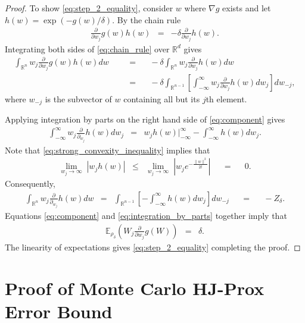 \documentclass{article}
\newcommand{\Real}{\mathbb{R}}
\newcommand{\E}{\mathbb{E}}
\newcommand{\amp}{\mathop{\:\:\,}\nolimits}
\theoremstyle{plain}
\theoremstyle{definition}
\theoremstyle{remark}
\begin{document}
\begin{proof}
To show \eqref{eq:step_2_equality}, consider $w$ where $\nabla g$ exists and let $h(w) = \exp(-g(w)/\delta)$. By the chain rule
\begin{eqnarray}
\label{eq:chain_rule}
\frac{\partial}{\partial w_j} g(w)h(w) & = & - \delta \frac{\partial}{\partial w_j}h(w).
\end{eqnarray}
Integrating both sides of \eqref{eq:chain_rule} over $\Real^d$ gives
\begin{equation}
\label{eq:component}
\begin{split}
    \int_{\Real^n} w_j \frac{\partial}{\partial w_j}g(w) h(w) dw  & \amp = \amp  -\delta \int_{\Real^n}  w_j \frac{\partial}{\partial w_j} h(w) dw \\ 
    & \amp = \amp -\delta\int_{\Real^{n-1}}\left[\int_{-\infty}^\infty w_j \frac{\partial}{\partial w_j}h(w)dw_j\right]dw_{-j},
\end{split}
\end{equation}
where
$w_{-j}$ is the subvector of $w$ containing all but its $j$th element.

Applying integration by parts on the right hand side of \eqref{eq:component} gives
\begin{eqnarray}
\int_{-\infty}^\infty w_j \frac{\partial}{\partial_{w_j}}h(w) d w_j & = & w_j h(w)\Big |_{-\infty}^\infty - \int_{-\infty}^\infty h(w)dw_j.
\end{eqnarray}
Note that \eqref{eq:strong_convexity_inequality} implies that
\begin{eqnarray}
\underset{w_j \rightarrow \infty}{\lim}\;
\left\lvert w_j h(w) \right\rvert & \leq & \underset{w_j \rightarrow \infty}{\lim}\;
\left\lvert w_j  e^{-\frac{\lVert w \rVert^2}{2t}}\right\rvert \amp = \amp 0.
\end{eqnarray}
Consequently,
\begin{eqnarray}
\label{eq:integration_by_parts}
       \int_{\Real^{n}} w_j \frac{\partial}{\partial_{w_j}}h(w)dw & = & \int_{\Real^{n-1}}\left[-\int_{-\infty}^\infty h(w)dw_j \right]dw_{-j} \amp = \amp -Z_\delta.
\end{eqnarray}
Equations \eqref{eq:component} and \eqref{eq:integration_by_parts} together imply that
\begin{eqnarray}
\E_{\rho_\delta}\left( W_j \frac{\partial}{\partial w_j} g(W) \right) & = & \delta.
\end{eqnarray}
The linearity of expectations gives \eqref{eq:step_2_equality} completing the proof.
\end{proof}
\section{Proof of Monte Carlo HJ-Prox Error Bound}\label{Ap: MC Error}
\end{document}

